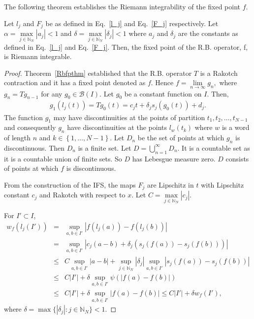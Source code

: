 \documentclass[sn-mathphys-num]{sn-jnl}
\numberwithin{equation}{section}
\begin{document}
\noindent The following theorem establishes the Riemann integrability of the fixed point $f$.

\begin{theorem} \label{riemann}
Let $l_j$ and $F_j$ be as defined in Eq.~\eqref{l_j} and Eq.~\eqref{F_j} respectively. Let $\alpha=\max\limits_{j\in \mathbb N_N}|a_j| < 1$ and $\delta=\max\limits_{j\in \mathbb{N}_N}|\delta_j|<1$ where $a_j$ and $\delta_j$ are the constants as defined in Eq.~\eqref{l_j} and Eq.~\eqref{F_j}.
Then, the fixed point of the R.B. operator, f, is Riemann integrable.
\end{theorem}
\begin{proof}
Theorem~\ref{Rbfpthm} established that the R.B. operator $T$ is a Rakotch contraction and it has a fixed point denoted as 
$f$. Hence $f=\lim\limits_{n\rightarrow\infty}g_n,$ where $g_n=Tg_{n-1}$ for any $g_0\in \mathcal{B}(I)$. Let $g_0$ be a constant function on $I$. Then,
\begin{eqnarray*}
g_1(l_j(t))=Tg_0(t) = c_jt+\delta_js_j(g_0(t))+d_j.
\end{eqnarray*}
The function $g_1$ may have discontinuities at the points of partition $t_1, t_2,\ldots, t_{N-1}$ and consequently $g_n$ have discontinuities at the points $l_{w}(t_k)$ where $w$ is a word of length $n$ and $k\in\left\{1,\ldots, N-1\right\}$. Let $D_n$ be the set of points at which $g_n$ is discontinuous. Then $D_n$ is a finite set. Let $D=\bigcup\limits_{n=1}^{\infty}D_n$. It is a countable set as it is a countable union of finite sets. So $D$ has Lebesgue measure zero.  $D$ consists of points at which $f$ is discontinuous.

 From the construction of the IFS, the maps $F_j$ are Lipschitz in $t$ with Lipschitz constant $c_j$ and Rakotch with respect to $x$. Let $C=\max\limits_{j\in\mathbb N_N}|c_j|$.

\noindent For $I'\subset I$,
\begin{eqnarray} \nonumber
w_f(l_j(I'))&=&\sup_{a,b\in I'}|f(l_j(a))-f(l_j(b))|\\ \nonumber
&=&\sup_{a,b\in I'}|c_j(a-b)+\delta_j(s_j(f(a))-s_j(f(b)))|\\ \nonumber
&\leq&C\sup_{a,b\in I'}|a-b|+\sup\limits_{j\in\mathbb{N}_N}|\delta_j|\sup_{a,b\in I'}|s_j(f(a))-s_j(f(b))|\\ \nonumber
&\leq&C|I'|+\delta\sup_{a,b\in I'}\psi(|f(a)-f(b)|)\\ 
&\leq&C|I'|+\delta\sup_{a,b\in I'}|f(a)-f(b)| \leq C|I'|+\delta w_f(I'),\label{5}
\end{eqnarray}
where $\delta=\max\{|\delta_j|:j\in\mathbb N_N\}<1$. 


\end{proof}
\end{document}
